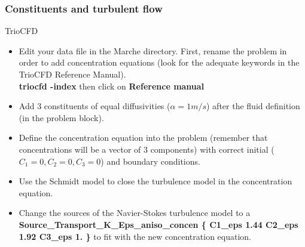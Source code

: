 \documentclass[10pt, hyperref={unicode=true,pdfusetitle, bookmarks=true,bookmarksnumbered=false,bookmarksopen=false, breaklinks=false,pdfborder={0 0l 1},backref=true,colorlinks=true,linkcolor=darkblue,pageanchor}]{beamer}
\begin{document}
\begin{frame}
\frametitle{Constituents and turbulent flow}
\begin{block}{TrioCFD}

\begin{itemize}

\item Edit your data file in the Marche directory. First, rename the problem in order to add concentration equations (look for the adequate keywords in the TrioCFD Reference Manual).\\
\textbf{triocfd -index} then click on \textbf{Reference manual}

\item Add 3 constituents of equal diffusivities ($\alpha=1m/s$) after the fluid definition (in the problem block).

\item Define the concentration equation into the problem (remember that concentrations will be a vector of 3 components) with correct initial ($C_1=0, C_2=0, C_3=0$) and boundary conditions.

\item Use the Schmidt model to close the turbulence model in the concentration equation.

\item Change the sources of the Navier-Stokes turbulence model to a \textbf{Source\_Transport\_K\_Eps\_aniso\_concen \{ C1\_eps 1.44 C2\_eps 1.92 C3\_eps 1. \} } to fit with the new concentration equation.

\end{itemize}

\end{block}
\end{frame}
\end{document}
